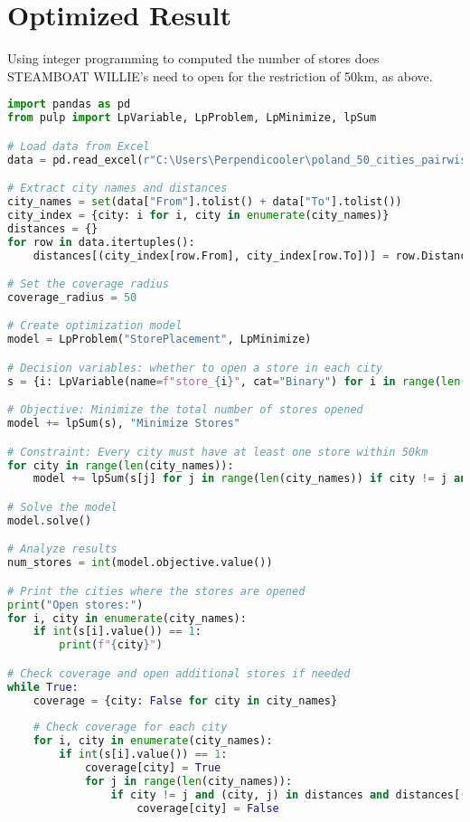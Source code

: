 \section*{Optimized Result}
Using integer programming to computed the number of  stores does STEAMBOAT WILLIE's need to open for the restriction of 50km, as above.

\begin{center}
    \begin{lstlisting}[language=Python, caption=Minimize the store opening within 50km in every city of poland]
        import pandas as pd
from pulp import LpVariable, LpProblem, LpMinimize, lpSum

# Load data from Excel
data = pd.read_excel(r"C:\Users\Perpendicooler\poland_50_cities_pairwise_distances.xlsx")  

# Extract city names and distances
city_names = set(data["From"].tolist() + data["To"].tolist())
city_index = {city: i for i, city in enumerate(city_names)}
distances = {}
for row in data.itertuples():
    distances[(city_index[row.From], city_index[row.To])] = row.Distance

# Set the coverage radius
coverage_radius = 50

# Create optimization model
model = LpProblem("StorePlacement", LpMinimize)

# Decision variables: whether to open a store in each city
s = {i: LpVariable(name=f"store_{i}", cat="Binary") for i in range(len(city_names))}

# Objective: Minimize the total number of stores opened
model += lpSum(s), "Minimize Stores"

# Constraint: Every city must have at least one store within 50km
for city in range(len(city_names)):
    model += lpSum(s[j] for j in range(len(city_names)) if city != j and (city, j) in distances) >= 1, f"City {city+1} Coverage"

# Solve the model
model.solve()

# Analyze results
num_stores = int(model.objective.value())

# Print the cities where the stores are opened
print("Open stores:")
for i, city in enumerate(city_names):
    if int(s[i].value()) == 1:
        print(f"{city}")

# Check coverage and open additional stores if needed
while True:
    coverage = {city: False for city in city_names}
    
    # Check coverage for each city
    for i, city in enumerate(city_names):
        if int(s[i].value()) == 1:
            coverage[city] = True
            for j in range(len(city_names)):
                if city != j and (city, j) in distances and distances[(city, j)] > coverage_radius:
                    coverage[city] = False
    

\end{lstlisting}
\end{center}
